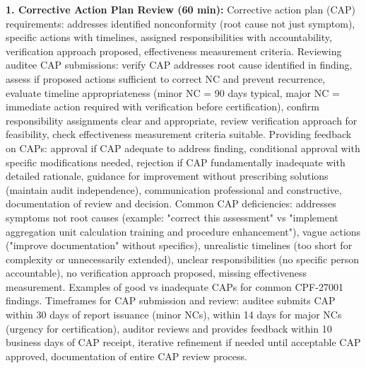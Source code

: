 \documentclass[11pt,a4paper]{article}
\begin{document}
\textbf{1. Corrective Action Plan Review (60 min):} Corrective action plan (CAP) requirements: addresses identified nonconformity (root cause not just symptom), specific actions with timelines, assigned responsibilities with accountability, verification approach proposed, effectiveness measurement criteria. Reviewing auditee CAP submissions: verify CAP addresses root cause identified in finding, assess if proposed actions sufficient to correct NC and prevent recurrence, evaluate timeline appropriateness (minor NC = 90 days typical, major NC = immediate action required with verification before certification), confirm responsibility assignments clear and appropriate, review verification approach for feasibility, check effectiveness measurement criteria suitable. Providing feedback on CAPs: approval if CAP adequate to address finding, conditional approval with specific modifications needed, rejection if CAP fundamentally inadequate with detailed rationale, guidance for improvement without prescribing solutions (maintain audit independence), communication professional and constructive, documentation of review and decision. Common CAP deficiencies: addresses symptoms not root causes (example: "correct this assessment" vs "implement aggregation unit calculation training and procedure enhancement"), vague actions ("improve documentation" without specifics), unrealistic timelines (too short for complexity or unnecessarily extended), unclear responsibilities (no specific person accountable), no verification approach proposed, missing effectiveness measurement. Examples of good vs inadequate CAPs for common CPF-27001 findings. Timeframes for CAP submission and review: auditee submits CAP within 30 days of report issuance (minor NCs), within 14 days for major NCs (urgency for certification), auditor reviews and provides feedback within 10 business days of CAP receipt, iterative refinement if needed until acceptable CAP approved, documentation of entire CAP review process.
\end{document}
